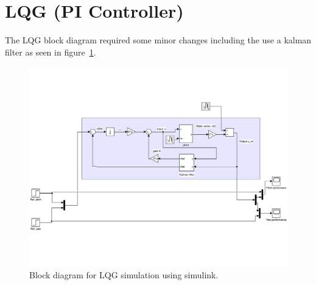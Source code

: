 \section{LQG (PI Controller)}
The LQG block diagram required some minor changes including the use a kalman filter as seen in figure~\ref{fig:LQG_Sim_Block_Diagram}.
\begin{figure}[!htbp]
    \centering
    \includegraphics[width=.8\textwidth,keepaspectratio=true]{figs/img/LQG_Simulink}
    \caption{Block diagram for LQG simulation using simulink.}
    \label{fig:LQG_Sim_Block_Diagram}
\end{figure}
